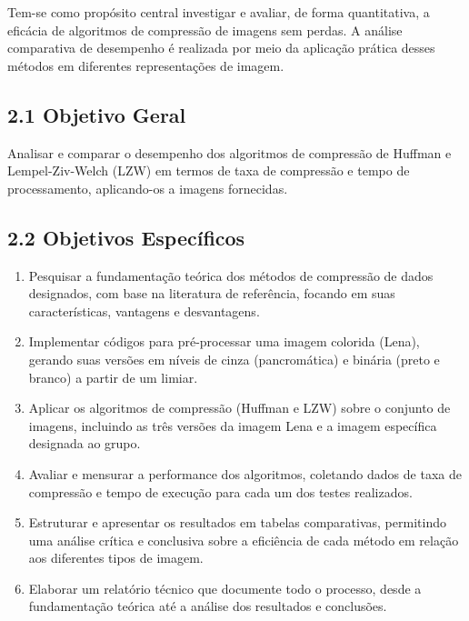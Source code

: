 \documentclass{report}
\begin{document}
Tem-se como propósito central investigar e avaliar, de forma quantitativa, a eficácia de algoritmos de compressão de imagens sem perdas. A análise comparativa de desempenho é realizada por meio da aplicação prática desses métodos em diferentes representações de imagem.

\subsection*{2.1 Objetivo Geral}
\label{sec:objetivo_geral}

Analisar e comparar o desempenho dos algoritmos de compressão de Huffman e Lempel-Ziv-Welch (LZW) em termos de taxa de compressão e tempo de processamento, aplicando-os a imagens fornecidas.
\subsection*{2.2 Objetivos Específicos}
\label{sec:objetivos_especificos}

\begin{enumerate}
    \item Pesquisar a fundamentação teórica dos métodos de compressão de dados designados, com base na literatura de referência, focando em suas características, vantagens e desvantagens.
    
    \item Implementar códigos para pré-processar uma imagem colorida (Lena), gerando suas versões em níveis de cinza (pancromática) e binária (preto e branco) a partir de um limiar.
    
    \item Aplicar os algoritmos de compressão (Huffman e LZW) sobre o conjunto de imagens, incluindo as três versões da imagem Lena e a imagem específica designada ao grupo.
    
    \item Avaliar e mensurar a performance dos algoritmos, coletando dados de taxa de compressão e tempo de execução para cada um dos testes realizados.
    
    \item Estruturar e apresentar os resultados em tabelas comparativas, permitindo uma análise crítica e conclusiva sobre a eficiência de cada método em relação aos diferentes tipos de imagem.
    
    \item Elaborar um relatório técnico que documente todo o processo, desde a fundamentação teórica até a análise dos resultados e conclusões.
\end{enumerate}
\end{document}
